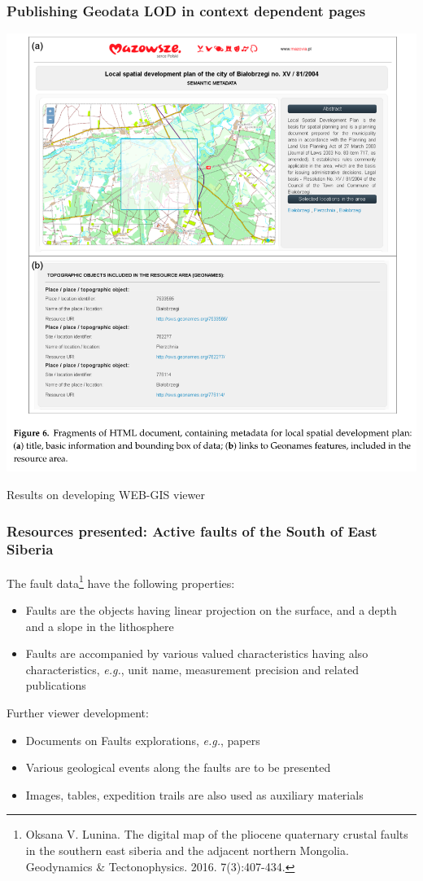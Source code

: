 \documentclass[10pt]{beamer}
\begin{document}
\begin{frame}
  \frametitle{Publishing Geodata LOD in context dependent pages}
  \centering
  \includegraphics[width=0.7\linewidth]{integrating-og.png}
\end{frame}





\begin{frame}
  \centering
  \Large Results on developing WEB-GIS viewer
\end{frame}

\begin{frame}
  \frametitle{Resources presented: Active faults of the South of
    East Siberia}
  The fault data\footnote{Oksana V. Lunina.  The digital map of the pliocene quaternary crustal faults in the southern east siberia and the adjacent northern Mongolia. Geodynamics \& Tectonophysics. 2016. 7(3):407-434. 
} have the following properties:
  \begin{itemize}
  \item Faults are the objects having linear projection on the surface, and a depth and a slope in the lithosphere
  \item Faults are accompanied by various valued characteristics having also characteristics, \emph{e.g.}, unit name, measurement precision and related publications
  \end{itemize}
  Further viewer development:
  \begin{itemize}
  \item Documents on Faults explorations, \emph{e.g.}, papers
  \item Various geological events along the faults are to be presented
  \item Images, tables, expedition trails are also used as auxiliary materials
  \end{itemize}
\end{frame}
\end{document}
